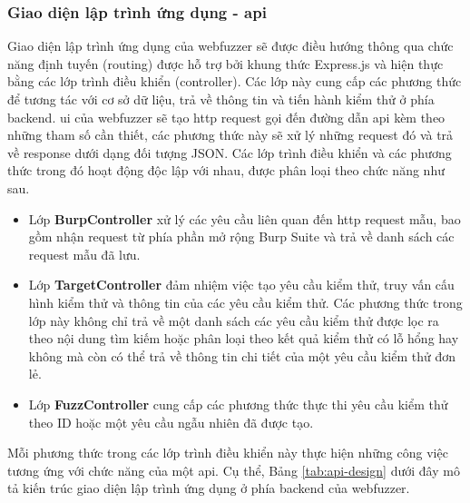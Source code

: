 \subsubsection{Giao diện lập trình ứng dụng - \acrshort{api}}
Giao diện lập trình ứng dụng của webfuzzer sẽ được điều hướng thông qua chức năng định tuyến (routing) được hỗ trợ bởi khung thức Express.js và hiện thực bằng các lớp trình điều khiển (controller). Các lớp này cung cấp các phương thức để tương tác với cơ sở dữ liệu, trả về thông tin và tiến hành kiểm thử ở phía backend. \acrshort{ui} của webfuzzer sẽ tạo \acrshort{http} request gọi đến đường dẫn \acrshort{api} kèm theo những tham số cần thiết, các phương thức này sẽ xử lý những request đó và trả về response dưới dạng đối tượng JSON. Các lớp trình điều khiển và các phương thức trong đó hoạt động độc lập với nhau, được phân loại theo chức năng như sau.
\begin{itemize}
    \item Lớp \textbf{BurpController} xử lý các yêu cầu liên quan đến \acrshort{http} request mẫu, bao gồm nhận request từ phía phần mở rộng Burp Suite và trả về danh sách các request mẫu đã lưu.
    \item Lớp \textbf{TargetController} đảm nhiệm việc tạo yêu cầu kiểm thử, truy vấn cấu hình kiểm thử và thông tin của các yêu cầu kiểm thử. Các phương thức trong lớp này không chỉ trả về một danh sách các yêu cầu kiểm thử được lọc ra theo nội dung tìm kiếm hoặc phân loại theo kết quả kiểm thử có lỗ hổng hay không mà còn có thể trả về thông tin chi tiết của một yêu cầu kiểm thử đơn lẻ.
    \item Lớp \textbf{FuzzController} cung cấp các phương thức thực thi yêu cầu kiểm thử theo ID hoặc một yêu cầu ngẫu nhiên đã được tạo.
\end{itemize}
Mỗi phương thức trong các lớp trình điều khiển này thực hiện những công việc tương ứng với chức năng của một \acrshort{api}. Cụ thể, Bảng \ref{tab:api-design} dưới đây mô tả kiến trúc giao diện lập trình ứng dụng ở phía backend của webfuzzer.
\FloatBarrier
